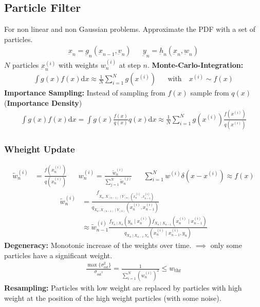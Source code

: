 \begin{mdframed}[style=eqbox]
\subsection{Particle Filter}
For non linear and non Gaussian problems. Approximate the PDF with a set of particles.
\vspace*{-4pt}
\begin{align*}
  \underbar{x}_n = \underbar{g}_n(\underbar{x}_{n-1}, \underbar{v}_n) && \underbar{y}_n = \underbar{h}_n(\underbar{x}_n, \underbar{w}_n)
\end{align*}
$N$ particles $\underbar{x}_n^{(i)}$ with weights $w_n^{(i)}$ at step $n$.
\textbf{Monte-Carlo-Integration:}
\vspace*{-4pt}
\begin{align*}
  \int g(x) f(x) \text{d}x \approx \frac{1}{N} \sum_{i=1}^N g(x^{(i)}) && \text{with} \quad x^{(i)} \sim f(x)
\end{align*}
\textbf{Importance Sampling:} Instead of sampling from $f(x)$ sample from $q(x)$ (\textbf{Importance Density})
\vspace*{-4pt}
\begin{align*}
  \int g(x) f(x) \text{d}x = \int g(x) \frac{f(x)}{q(x)} q(x) \text{d}x \approx \frac{1}{N} \sum_{i=1}^N g(x^{(i)}) \frac{f(x^{(i)})}{q(x^{(i)})}
\end{align*}
\subsubsection{Wheight Update}
\vspace*{-12pt}
\begin{align*}
  \tilde{w}_n^{(i)} &= \frac{f(x_n^{(i)})}{q(x_n^{(i)})} && w_n^{(i)} = \frac{\tilde{w}_n^{(i)}}{\sum_{j=1}^N \tilde{w}_n^{(j)}} && \sum_{i=1}^N w^{(i)} \delta(x - x^{(i)}) \approx f(x)
\end{align*}
\begin{align*}
  \tilde{w}_n^{(i)} &= \frac{f_{X_n,X_{(n - 1)}\mid Y_{(n)}(x_n^{(i)}, x_{n-1}^{(i)})}}{q_{X_n,X_{(n - 1)}\mid Y_{(n)}}(x_n^{(i)}, x_{n-1}^{(i)})}\\
   &\approx \tilde{w}_{n-1}^{(i)} \frac{f_{Y_n \mid X_n}(y_n \mid x_n^{(i)})f_{X_n \mid X_{n - 1}}(x_n^{(i)} \mid x_{n-1}^{(i)})}{q_{X_n \mid X_{n - 1}, Y_n}(x_n^{(i)} \mid x_{n-1}^{(i)}, y_n)}
\end{align*}
\textbf{Degeneracy:} Monotonic increase of the weights over time. $\implies$ only some particles have a significant weight.
\begin{align*}
  \frac{\max\{\sigma_{\text{est}}^2\}}{\sigma_{\text{est}^2}} = \frac{1}{\sum^N_{i=1} (w_n^{(i)})^2} \leq w_{\text{thr}}
\end{align*}
\textbf{Resampling:} Particles with low weight are replaced by particles with high weight at the position of the high weight particles (with some noise).
\end{mdframed}
